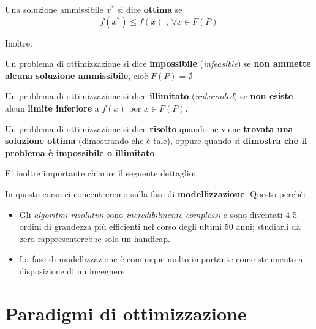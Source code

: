 \begin{definition}
    Una soluzione ammissibile $x^*$ si dice \textbf{ottima} se
    \[
        f(x^*) \le f(x) \text{ , } \forall x \in F(P)
    \] 
\end{definition}

Inoltre:

\begin{definition}
    Un problema di ottimizzazione si dice \textbf{impossibile} (\textit{infeasible})
    se \textbf{non ammette alcuna soluzione ammissibile}, cioè
    $F(P) = \emptyset$
\end{definition}

\begin{definition}
    Un problema di ottimizzazione si dice \textbf{illimitato} (\textit{unbounded}) 
    se \textbf{non esiste} alcun \textbf{limite inferiore} a $f(x)$ per $x\in F(P)$.
\end{definition}

\begin{definition}
    Un problema di ottimizzazione si dice \textbf{risolto} quando ne viene
    \textbf{trovata una soluzione ottima} (dimostrando che è tale), oppure 
    quando si \textbf{dimostra che il problema è impossibile o illimitato}.
\end{definition}

E' inoltre importante chiarire il seguente dettaglio:

\begin{warn}
    In questo corso ci concentreremo sulla fase di \textbf{modellizzazione}.
    Questo perchè:
    \begin{itemize}
        \item Gli \textit{algoritmi risolutivi} sono \textit{incredibilmente 
            complessi} e sono diventati 4-5 ordini di grandezza più
            efficienti nel corso degli ultimi 50 anni; studiarli da zero
            rappresenterebbe solo un handicap.
        \item La fase di modellizzazione è comunque molto importante
            come strumento a disposizione di un ingegnere.
    \end{itemize}
\end{warn}

\section{Paradigmi di ottimizzazione}

